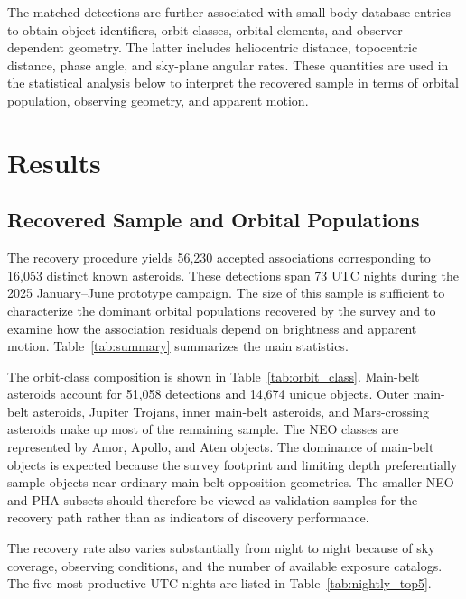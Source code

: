 \documentclass[referee]{raa}
\begin{document}
The matched detections are further associated with small-body database entries to obtain object identifiers, orbit classes, orbital elements, and observer-dependent geometry. The latter includes heliocentric distance, topocentric distance, phase angle, and sky-plane angular rates. These quantities are used in the statistical analysis below to interpret the recovered sample in terms of orbital population, observing geometry, and apparent motion.

\section{Results}
\label{sec:results}

\subsection{Recovered Sample and Orbital Populations}

The recovery procedure yields 56,230 accepted associations corresponding to 16,053 distinct known asteroids. These detections span 73 UTC nights during the 2025 January--June prototype campaign. The size of this sample is sufficient to characterize the dominant orbital populations recovered by the survey and to examine how the association residuals depend on brightness and apparent motion. Table~\ref{tab:summary} summarizes the main statistics.



The orbit-class composition is shown in Table~\ref{tab:orbit_class}. Main-belt asteroids account for 51,058 detections and 14,674 unique objects. Outer main-belt asteroids, Jupiter Trojans, inner main-belt asteroids, and Mars-crossing asteroids make up most of the remaining sample. The NEO classes are represented by Amor, Apollo, and Aten objects. The dominance of main-belt objects is expected because the survey footprint and limiting depth preferentially sample objects near ordinary main-belt opposition geometries. The smaller NEO and PHA subsets should therefore be viewed as validation samples for the recovery path rather than as indicators of discovery performance.



The recovery rate also varies substantially from night to night because of sky coverage, observing conditions, and the number of available exposure catalogs. The five most productive UTC nights are listed in Table~\ref{tab:nightly_top5}.
\end{document}
